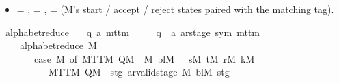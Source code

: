 \begin{isabellebody}
\begin{isamarkuptext}
\begin{itemize}
\item {} = ,
 = ,
 = 
(M's start / accept / reject states paired with the
matching  tag).%
\end{itemize}%
\end{isamarkuptext}\isamarkuptrue%
\isamarkupfalse%
\ alphabet{\isacharunderscore}{\kern0pt}reduce\ {\isacharcolon}{\kern0pt}{\isacharcolon}{\kern0pt}\isanewline
\ \ {\isachardoublequoteopen}{\isacharparenleft}{\kern0pt}{\isacharprime}{\kern0pt}q{\isacharcomma}{\kern0pt}\ {\isacharprime}{\kern0pt}a{\isacharparenright}{\kern0pt}\ mttm\isanewline
\ \ \ \ {\isasymRightarrow}\ {\isacharparenleft}{\kern0pt}{\isacharprime}{\kern0pt}q\ {\isasymtimes}\ {\isacharprime}{\kern0pt}a\ ar{\isacharunderscore}{\kern0pt}stage{\isacharcomma}{\kern0pt}\ sym{}{\isacharparenright}{\kern0pt}\ mttm{\isachardoublequoteclose}\isanewline
\ \ \isanewline
\ \ \ \ {\isachardoublequoteopen}alphabet{\isacharunderscore}{\kern0pt}reduce\ M\ {\isacharequal}{\kern0pt}\isanewline
\ \ \ \ \ \ \ {\isacharparenleft}{\kern0pt}case\ M\ of\ MTTM\ Q{\isacharunderscore}{\kern0pt}M\ {\isacharunderscore}{\kern0pt}\ {\isasymGamma}{\isacharunderscore}{\kern0pt}M\ bl{\isacharunderscore}{\kern0pt}M\ {\isacharunderscore}{\kern0pt}\ {\isacharunderscore}{\kern0pt}\ s{\isacharunderscore}{\kern0pt}M\ t{\isacharunderscore}{\kern0pt}M\ r{\isacharunderscore}{\kern0pt}M\ k{\isacharunderscore}{\kern0pt}M\ {\isasymRightarrow}\isanewline
\ \ \ \ \ \ \ \ \ \ MTTM\ {\isacharparenleft}{\kern0pt}Q{\isacharunderscore}{\kern0pt}M\ {\isasymtimes}\ {\isacharbraceleft}{\kern0pt}stg{\isachardot}{\kern0pt}\ ar{\isacharunderscore}{\kern0pt}valid{\isacharunderscore}{\kern0pt}stage\ {\isasymGamma}{\isacharunderscore}{\kern0pt}M\ bl{\isacharunderscore}{\kern0pt}M\ stg\isanewline

\end{isabellebody}

